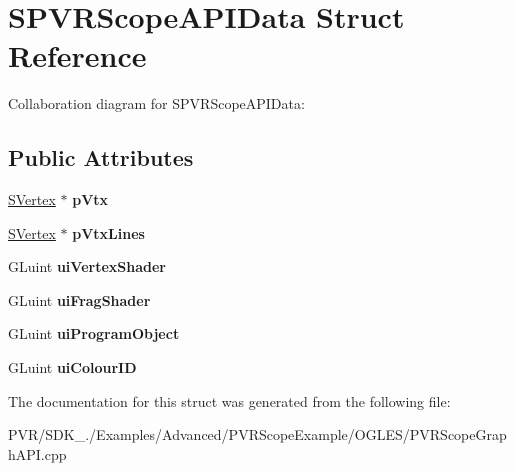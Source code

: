 \hypertarget{struct_s_p_v_r_scope_a_p_i_data}{\section{S\+P\+V\+R\+Scope\+A\+P\+I\+Data Struct Reference}
\label{struct_s_p_v_r_scope_a_p_i_data}
}


Collaboration diagram for S\+P\+V\+R\+Scope\+A\+P\+I\+Data\+:
\subsection*{Public Attributes}
\begin{DoxyCompactItemize}
\item 
\hypertarget{struct_s_p_v_r_scope_a_p_i_data_a5d5e10372a18bf19e79fb01acea9517d}{\hyperlink{struct_s_vertex}{S\+Vertex} $\ast$ {\bfseries p\+Vtx}}\label{struct_s_p_v_r_scope_a_p_i_data_a5d5e10372a18bf19e79fb01acea9517d}

\item 
\hypertarget{struct_s_p_v_r_scope_a_p_i_data_aa7330016850fb111e98139cc658d8a68}{\hyperlink{struct_s_vertex}{S\+Vertex} $\ast$ {\bfseries p\+Vtx\+Lines}}\label{struct_s_p_v_r_scope_a_p_i_data_aa7330016850fb111e98139cc658d8a68}

\item 
\hypertarget{struct_s_p_v_r_scope_a_p_i_data_ad6a9cea8cd0eaf214ceca9f55407042d}{G\+Luint {\bfseries ui\+Vertex\+Shader}}\label{struct_s_p_v_r_scope_a_p_i_data_ad6a9cea8cd0eaf214ceca9f55407042d}

\item 
\hypertarget{struct_s_p_v_r_scope_a_p_i_data_a01203aae86563762acd20a567524b4c4}{G\+Luint {\bfseries ui\+Frag\+Shader}}\label{struct_s_p_v_r_scope_a_p_i_data_a01203aae86563762acd20a567524b4c4}

\item 
\hypertarget{struct_s_p_v_r_scope_a_p_i_data_a5f4266305cf44538427494862c7ddfd1}{G\+Luint {\bfseries ui\+Program\+Object}}\label{struct_s_p_v_r_scope_a_p_i_data_a5f4266305cf44538427494862c7ddfd1}

\item 
\hypertarget{struct_s_p_v_r_scope_a_p_i_data_a843e6d90cb0f3113289970039a57877b}{G\+Luint {\bfseries ui\+Colour\+I\+D}}\label{struct_s_p_v_r_scope_a_p_i_data_a843e6d90cb0f3113289970039a57877b}

\end{DoxyCompactItemize}


The documentation for this struct was generated from the following file\+:\begin{DoxyCompactItemize}
\item 
P\+V\+R/\+S\+D\+K\+\_./\+Examples/\+Advanced/\+P\+V\+R\+Scope\+Example/\+O\+G\+L\+E\+S/P\+V\+R\+Scope\+Graph\+A\+P\+I.\+cpp\end{DoxyCompactItemize}
